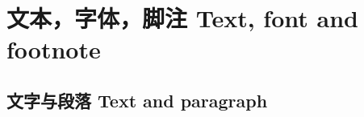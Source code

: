 \documentclass[draft,twoside]{fduthesis}
\begin{document}
\raggedbottom
%
%
%
%
%

\mainmatter

\def\PLACEHOLDERi{————汉字————汉字————汉字————汉字————汉字————六七八九十}
\def\PLACEHOLDER{\zhlipsum[1]}%

\chapter{文本，字体，脚注 \quad Text, font and footnote}
\zhlipsum[1]
\section{文字与段落 Text and paragraph}
\zhlipsum[1]
\clearpage
\zhlipsum[1-2]
\end{document}
